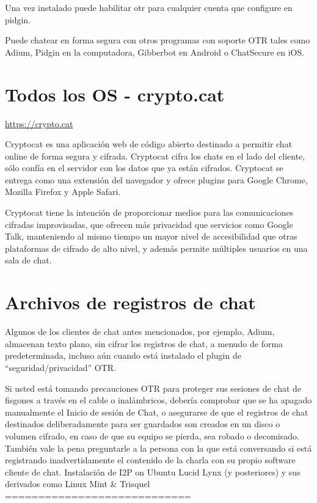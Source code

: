 \documentclass[10pt,a5paper,twoside,,]{book}
\begin{document}
Una vez instalado puede habilitar otr para cualquier cuenta que
configure en pidgin.

Puede chatear en forma segura con otros programas con soporte OTR tales
como Adium, Pidgin en la computadora, Gibberbot en Android o ChatSecure
en iOS.

\section{Todos los OS - crypto.cat}\label{todos-los-os---crypto.cat}

\url{https://crypto.cat}

Cryptocat es una aplicación web de código abierto destinado a permitir
chat online de forma segura y cifrada. Cryptocat cifra los chats en el
lado del cliente, sólo confía en el servidor con los datos que ya están
cifrados. Cryptocat se entrega como una extensión del navegador y ofrece
plugins para Google Chrome, Mozilla Firefox y Apple Safari.

Cryptocat tiene la intención de proporcionar medios para las
comunicaciones cifradas improvisadas, que ofrecen más privacidad que
servicios como Google Talk, manteniendo al mismo tiempo un mayor nivel
de accesibilidad que otras plataformas de cifrado de alto nivel, y
además permite múltiples usuarios en una sala de chat.

\section{Archivos de registros de
chat}\label{archivos-de-registros-de-chat}

Algunos de los clientes de chat antes mencionados, por ejemplo, Adium,
almacenan texto plano, sin cifrar los registros de chat, a menudo de
forma predeterminada, incluso aún cuando está instalado el plugin de
``seguridad/privacidad'' OTR.

Si usted está tomando precauciones OTR para proteger sus sesiones de
chat de fisgones a través en el cable o inalámbricos, debería comprobar
que se ha apagado manualmente el Inicio de sesión de Chat, o asegurarse
de que el registros de chat destinados deliberadamente para ser
guardados son creados en un disco o volumen cifrado, en caso de que su
equipo se pierda, sea robado o decomisado. También vale la pena
preguntarle a la persona con la que está conversando si está registrando
inadvertidamente el contenido de la charla con su propio software
cliente de chat. Instalación de I2P on Ubuntu Lucid Lynx (y posteriores)
y sus derivados como Linux Mint \& Trisquel ============================
\end{document}
